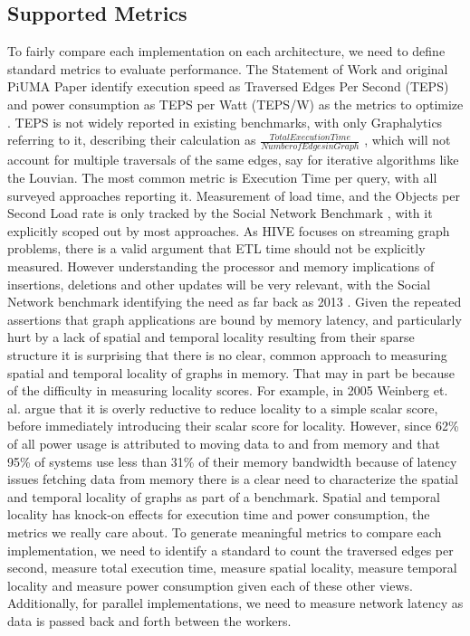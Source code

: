 \documentclass[letterpaper, 10pt]{article}
\begin{document}
\begin{multicols}{2}
        \subsection{Supported Metrics}
        To fairly compare each implementation on each architecture, we need to define standard metrics to evaluate performance. 
        The Statement of Work and original PiUMA Paper identify execution speed as Traversed Edges Per Second (TEPS) and power consumption as TEPS per Watt (TEPS/W) as the metrics to optimize \cite{Aananthakrishnan2020}. 
        TEPS is not widely reported in existing benchmarks, with only Graphalytics referring to it, describing their calculation as $\frac{Total Execution Time}{Number of Edges in Graph}$ \cite{Capota2015}, which will not account for multiple traversals of the same edges, say for iterative algorithms like the Louvian.
        The most common metric is Execution Time per query, with all surveyed approaches reporting it. 
        Measurement of load time, and the Objects per Second Load rate is only tracked by the Social Network Benchmark \cite{Angles2013}, with it explicitly scoped out by most approaches. 
        As HIVE focuses on streaming graph problems, there is a valid argument that ETL time should not be explicitly measured. 
        However understanding the processor and memory implications of insertions, deletions and other updates will be very relevant, with the Social Network benchmark identifying the need as far back as 2013 \cite{Angles2013}.
        Given the repeated assertions that graph applications are bound by memory latency, and particularly hurt by a lack of spatial and temporal locality resulting from their sparse structure \cite{Mutlu2023,Ren2010,Blondel2008,Capota2015,Beamer2017} it is surprising that there is no clear, common approach to measuring spatial and temporal locality of graphs in memory.
        That may in part be because of the difficulty in measuring locality scores. For example, in 2005 Weinberg et. al. argue that it is overly reductive to reduce locality to a simple scalar score, before immediately introducing their scalar score for locality.
        However, since 62\% of all power usage is attributed to moving data to and from memory \cite{Mutlu2023} and that 95\% of systems use less than 31\% of their memory bandwidth \cite{Kanev2015} because of latency issues fetching data from memory there is a clear need to characterize the spatial and temporal locality of graphs as part of a benchmark. 
        Spatial and temporal locality has knock-on effects for execution time and power consumption, the metrics we really care about.
        To generate meaningful metrics to compare each implementation, we need to identify a standard to count the traversed edges per second, measure total execution time, measure spatial locality, measure temporal locality and measure power consumption given each of these other views.
        Additionally, for parallel implementations, we need to measure network latency as data is passed back and forth between the workers. 


\end{multicols}
\end{document}
